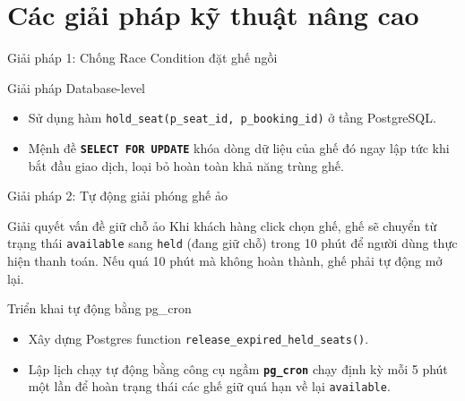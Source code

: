 \documentclass{beamer}
\begin{document}
\section{Các giải pháp kỹ thuật nâng cao}

\begin{frame}{Giải pháp 1: Chống Race Condition đặt ghế ngồi}
  \begin{center}
  \end{center}
  \begin{block}{Giải pháp Database-level}
    \begin{itemize}
      \item Sử dụng hàm \texttt{hold\_seat(p\_seat\_id, p\_booking\_id)} ở tầng PostgreSQL.
      \item Mệnh đề \textbf{\texttt{SELECT FOR UPDATE}} khóa dòng dữ liệu của ghế đó ngay lập tức khi bắt đầu giao dịch, loại bỏ hoàn toàn khả năng trùng ghế.
    \end{itemize}
  \end{block}
\end{frame}

\begin{frame}{Giải pháp 2: Tự động giải phóng ghế ảo}
  \begin{block}{Giải quyết vấn đề giữ chỗ ảo}
    Khi khách hàng click chọn ghế, ghế sẽ chuyển từ trạng thái \texttt{available} sang \texttt{held} (đang giữ chỗ) trong 10 phút để người dùng thực hiện thanh toán. Nếu quá 10 phút mà không hoàn thành, ghế phải tự động mở lại.
  \end{block}
  \begin{exampleblock}{Triển khai tự động bằng pg\_cron}
    \begin{itemize}
      \item Xây dựng Postgres function \texttt{release\_expired\_held\_seats()}.
      \item Lập lịch chạy tự động bằng công cụ ngầm \textbf{\texttt{pg\_cron}} chạy định kỳ mỗi 5 phút một lần để hoàn trạng thái các ghế giữ quá hạn về lại \texttt{available}.
    \end{itemize}
  \end{exampleblock}
\end{frame}
\end{document}
